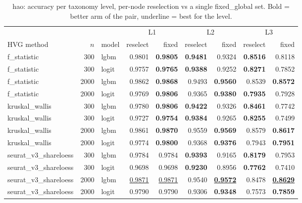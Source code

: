 \begin{table}[t]
\centering
\small
\begin{tabular}{lrlrrrrrr}
\toprule
 &  &  & \multicolumn{2}{c}{L1} & \multicolumn{2}{c}{L2} & \multicolumn{2}{c}{L3} \\
\cmidrule(lr){4-5}\cmidrule(lr){6-7}\cmidrule(lr){8-9}
HVG method & $n$ & model & reselect & fixed & reselect & fixed & reselect & fixed \\
\midrule
f\_statistic & 300 & lgbm & 0.9801 & \textbf{0.9805} & \textbf{0.9481} & 0.9324 & \textbf{0.8516} & 0.8118 \\
f\_statistic & 300 & logit & 0.9757 & \textbf{0.9765} & \textbf{0.9388} & 0.9252 & \textbf{0.8271} & 0.7852 \\
f\_statistic & 2000 & lgbm & 0.9862 & \textbf{0.9868} & 0.9493 & \textbf{0.9560} & 0.8539 & \textbf{0.8572} \\
f\_statistic & 2000 & logit & 0.9769 & \textbf{0.9806} & 0.9365 & \textbf{0.9380} & \textbf{0.7935} & 0.7928 \\
kruskal\_wallis & 300 & lgbm & 0.9780 & \textbf{0.9806} & \textbf{0.9422} & 0.9326 & \textbf{0.8461} & 0.7742 \\
kruskal\_wallis & 300 & logit & 0.9727 & \textbf{0.9754} & \textbf{0.9384} & 0.9265 & \textbf{0.8255} & 0.7499 \\
kruskal\_wallis & 2000 & lgbm & 0.9861 & \textbf{0.9870} & 0.9559 & \textbf{0.9569} & 0.8579 & \textbf{0.8617} \\
kruskal\_wallis & 2000 & logit & 0.9774 & \textbf{0.9800} & 0.9368 & \textbf{0.9376} & 0.7943 & \textbf{0.7951} \\
\midrule
seurat\_v3\_shareloess & 300 & lgbm & 0.9784 & 0.9784 & \textbf{0.9393} & 0.9165 & \textbf{0.8179} & 0.7953 \\
seurat\_v3\_shareloess & 300 & logit & 0.9698 & 0.9698 & \textbf{0.9230} & 0.8956 & \textbf{0.7762} & 0.7410 \\
seurat\_v3\_shareloess & 2000 & lgbm & \underline{0.9871} & \underline{0.9871} & 0.9540 & \underline{\textbf{0.9572}} & 0.8478 & \underline{\textbf{0.8629}} \\
seurat\_v3\_shareloess & 2000 & logit & 0.9790 & 0.9790 & 0.9306 & \textbf{0.9348} & 0.7573 & \textbf{0.7859} \\
\bottomrule
\end{tabular}
\caption{hao: accuracy per taxonomy level, per-node reselection vs a single fixed\_global set. Bold = better arm of the pair, underline = best for the level.}
\label{tab:comparison-hao-accuracy}
\end{table}